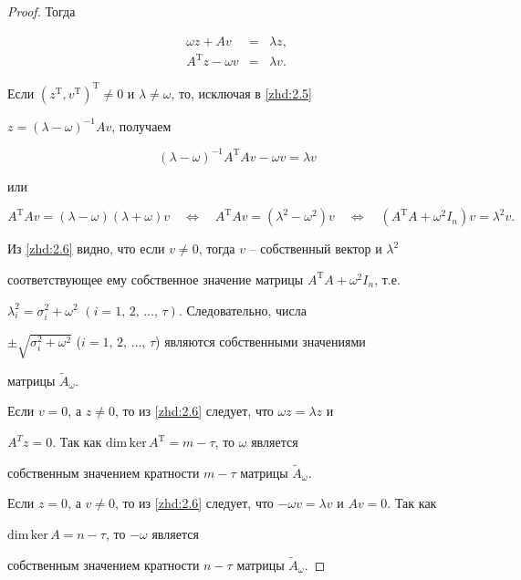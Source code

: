 \begin{proof}
Тогда

\begin{equation}\label{zhd:2.5}

    \begin{array}{ccc}

     \omega z+Av & = & \lambda z, \\

     A^\mathrm{T}z-\omega v & = & \lambda v.

   \end{array}

\end{equation}

Если $(z^\mathrm{T}, v^\mathrm{T})^\mathrm{T}\neq0$ и $\lambda\neq\omega$, то, исключая в \eqref{zhd:2.5}

$z=(\lambda-\omega)^{-1}Av$, получаем

$$ (\lambda-\omega)^{-1}A^\mathrm{T}Av-\omega v=\lambda v $$

или

\begin{equation}\label{zhd:2.6}

    A^\mathrm{T}Av=(\lambda-\omega)(\lambda+\omega)v \quad\Longleftrightarrow\quad A^\mathrm{T}Av

=(\lambda^2-\omega^2)v \quad\Longleftrightarrow\quad

(A^\mathrm{T}A+\omega^2I_n)v=\lambda^2v.

\end{equation}

Из \eqref{zhd:2.6} видно, что если $v\neq0$, тогда $v$ -- собственный вектор и $\lambda^2$

соответствующее ему собственное значение матрицы $A^\mathrm{T}A+\omega^2I_n$, т.е.

$\lambda_i^2=\sigma_i^2+\omega^2$ $(i=1,\,2,\,\dots,\,\tau)$. Следовательно, числа

$\pm\sqrt{\sigma_i^2+\omega^2}$ ($i=1,\,2,\,\dots,\,\tau$) являются собственными значениями

матрицы $\tilde A_\omega$.



Если $v=0$, а $z\neq0$, то из \eqref{zhd:2.6} следует, что $\omega z=\lambda z$ и

$A^Tz=0$. Так как $\mathrm{dim}\,\mathrm{ker}\,A^\mathrm{T}=m-\tau$, то $\omega$ является

собственным значением кратности $m-\tau$ матрицы $\tilde A_\omega$.



Если $z=0$, а $v\neq0$, то из \eqref{zhd:2.6} следует, что $-\omega v=\lambda v$ и $Av=0$. Так как

$\mathrm{dim}\,\mathrm{ker}\,A=n-\tau$, то $-\omega$ является

собственным значением кратности $n-\tau$ матрицы $\tilde A_\omega$.

\end{proof}



